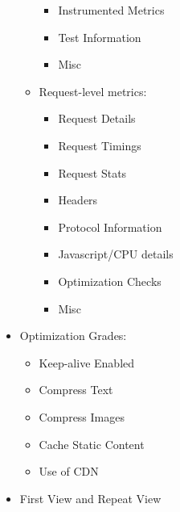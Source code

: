 \begin{itemize}
\begin{itemize}
\begin{itemize}
		\item Instrumented Metrics
		\item Test Information
		\item Misc
		\end{itemize}
	\item Request-level metrics:
		\begin{itemize}
		\item Request Details
		\item Request Timings
		\item Request Stats
		\item Headers
		\item Protocol Information
		\item Javascript/CPU details
		\item Optimization Checks
		\item Misc	
		\end{itemize}
	\end{itemize}
	
\item Optimization Grades:
	\begin{itemize}
	\item Keep-alive Enabled
	\item Compress Text
	\item Compress Images
	\item Cache Static Content
	\item Use of CDN
	\end{itemize}
\item First View and Repeat View
\end{itemize}





